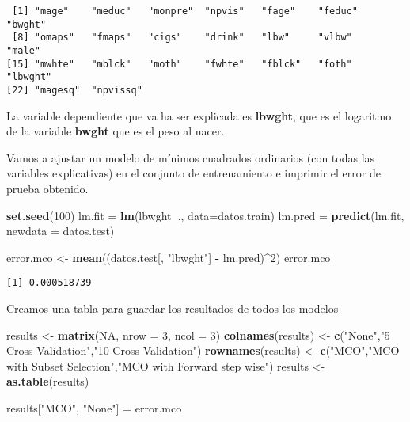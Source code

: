 \documentclass[]{article}
\newenvironment{Shaded}{\begin{snugshade}}{\end{snugshade}}
\newcommand{\KeywordTok}[1]{\textcolor[rgb]{0.13,0.29,0.53}{\textbf{#1}}}
\newcommand{\DataTypeTok}[1]{\textcolor[rgb]{0.13,0.29,0.53}{#1}}
\newcommand{\DecValTok}[1]{\textcolor[rgb]{0.00,0.00,0.81}{#1}}
\newcommand{\StringTok}[1]{\textcolor[rgb]{0.31,0.60,0.02}{#1}}
\newcommand{\OtherTok}[1]{\textcolor[rgb]{0.56,0.35,0.01}{#1}}
\newcommand{\OperatorTok}[1]{\textcolor[rgb]{0.81,0.36,0.00}{\textbf{#1}}}
\newcommand{\NormalTok}[1]{#1}
\begin{document}
\begin{verbatim}
 [1] "mage"    "meduc"   "monpre"  "npvis"   "fage"    "feduc"   "bwght"  
 [8] "omaps"   "fmaps"   "cigs"    "drink"   "lbw"     "vlbw"    "male"   
[15] "mwhte"   "mblck"   "moth"    "fwhte"   "fblck"   "foth"    "lbwght" 
[22] "magesq"  "npvissq"
\end{verbatim}

La variable dependiente que va ha ser explicada es \textbf{lbwght}, que
es el logaritmo de la variable \textbf{bwght} que es el peso al nacer.

Vamos a ajustar un modelo de mínimos cuadrados ordinarios (con todas las
variables explicativas) en el conjunto de entrenamiento e imprimir el
error de prueba obtenido.

\begin{Shaded}
\begin{Highlighting}[]
\KeywordTok{set.seed}\NormalTok{(}\DecValTok{100}\NormalTok{)}
\NormalTok{lm.fit =}\StringTok{ }\KeywordTok{lm}\NormalTok{(lbwght}\OperatorTok{~}\NormalTok{., }\DataTypeTok{data=}\NormalTok{datos.train)}
\NormalTok{lm.pred =}\StringTok{ }\KeywordTok{predict}\NormalTok{(lm.fit, }\DataTypeTok{newdata =}\NormalTok{ datos.test)}

\NormalTok{error.mco <-}\StringTok{ }\KeywordTok{mean}\NormalTok{((datos.test[, }\StringTok{"lbwght"}\NormalTok{] }\OperatorTok{-}\StringTok{ }\NormalTok{lm.pred)}\OperatorTok{^}\DecValTok{2}\NormalTok{)}
\NormalTok{error.mco}
\end{Highlighting}
\end{Shaded}

\begin{verbatim}
[1] 0.000518739
\end{verbatim}

Creamos una tabla para guardar los resultados de todos los modelos

\begin{Shaded}
\begin{Highlighting}[]
\NormalTok{results <-}\StringTok{ }\KeywordTok{matrix}\NormalTok{(}\OtherTok{NA}\NormalTok{, }\DataTypeTok{nrow =} \DecValTok{3}\NormalTok{, }\DataTypeTok{ncol =} \DecValTok{3}\NormalTok{)}
\KeywordTok{colnames}\NormalTok{(results) <-}\StringTok{ }\KeywordTok{c}\NormalTok{(}\StringTok{"None"}\NormalTok{,}\StringTok{"5 Cross Validation"}\NormalTok{,}\StringTok{"10 Cross Validation"}\NormalTok{)}
\KeywordTok{rownames}\NormalTok{(results) <-}\StringTok{ }\KeywordTok{c}\NormalTok{(}\StringTok{"MCO"}\NormalTok{,}\StringTok{"MCO with Subset Selection"}\NormalTok{,}\StringTok{"MCO with Forward step wise"}\NormalTok{)}
\NormalTok{results <-}\StringTok{ }\KeywordTok{as.table}\NormalTok{(results)}

\NormalTok{results[}\StringTok{"MCO"}\NormalTok{, }\StringTok{"None"}\NormalTok{] =}\StringTok{ }\NormalTok{error.mco}
\end{Highlighting}
\end{Shaded}
\end{document}
